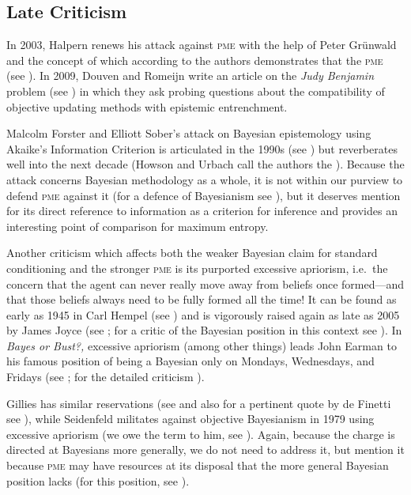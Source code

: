 \documentclass[phd,12pt,oneside]{ubcthesis}
\begin{document}
\subsection{Late Criticism}
\label{subsec:zaibahyi}

In 2003, Halpern renews his attack against \textsc{pme} with the help
of Peter Gr{\"u}nwald and the concept of 
which according to the authors demonstrates that the \textsc{pme}
 (see
). In 2009, Douven and Romeijn write
an article on the \emph{Judy Benjamin} problem (see
) in which they ask probing questions
about the compatibility of objective updating methods with epistemic
entrenchment.

Malcolm Forster and Elliott Sober's attack on Bayesian epistemology
using Akaike's Information Criterion is articulated in the 1990s (see
) but reverberates well into the next
decade (Howson and Urbach call the authors the ). Because the attack concerns Bayesian methodology as a
whole, it is not within our purview to defend \textsc{pme} against
it (for a defence of Bayesianism see
), but it deserves mention for its
direct reference to information as a criterion for inference and
provides an interesting point of comparison for maximum entropy.

Another criticism which affects both the weaker Bayesian claim for
standard conditioning and the stronger \textsc{pme} is its purported
excessive apriorism, i.e.\ the concern that the agent can never really
move away from beliefs once formed---and that those beliefs always
need to be fully formed all the time! It can be found as early as 1945
in Carl Hempel (see ) and is vigorously raised
again as late as 2005 by James Joyce (see ;
for a critic of the Bayesian position in this context see
). In \emph{Bayes or Bust?,} excessive
apriorism (among other things) leads John Earman to his famous
position of being a Bayesian only on Mondays, Wednesdays, and Fridays
(see ; for the detailed criticism
).

Gillies has similar reservations (see  and
also for a pertinent quote by de Finetti see
), while Seidenfeld militates against
objective Bayesianism in 1979 using excessive apriorism (we owe the
term to him, see ). Again, because the
charge is directed at Bayesians more generally, we do not need to
address it, but mention it because \textsc{pme} may have resources
at its disposal that the more general Bayesian position lacks (for
this position, see ).
\end{document}

